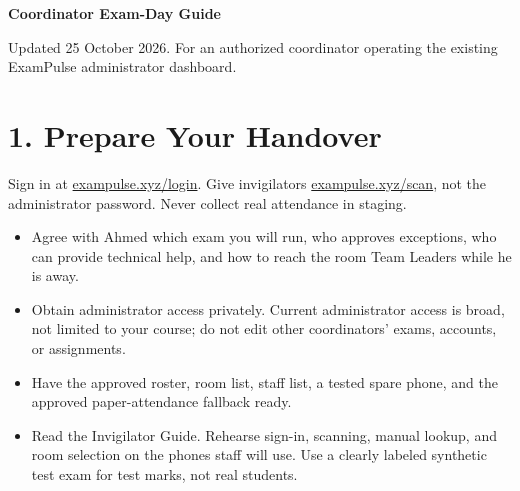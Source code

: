 \documentclass[10pt,a4paper]{article}
\begin{document}
{\LARGE\bfseries Coordinator Exam-Day Guide}\par\medskip
Updated 25 October 2026. For an authorized coordinator operating the existing ExamPulse administrator dashboard.\par
\section*{1. Prepare Your Handover}
Sign in at \href{https://exampulse.xyz/login}{exampulse.xyz/login}. Give invigilators \href{https://exampulse.xyz/scan}{exampulse.xyz/scan}, not the administrator password. Never collect real attendance in staging.\par
\begin{itemize}\item[\textbullet] Agree with Ahmed which exam you will run, who approves exceptions, who can provide technical help, and how to reach the room Team Leaders while he is away.\end{itemize}
\begin{itemize}\item[\textbullet] Obtain administrator access privately. Current administrator access is broad, not limited to your course; do not edit other coordinators' exams, accounts, or assignments.\end{itemize}
\begin{itemize}\item[\textbullet] Have the approved roster, room list, staff list, a tested spare phone, and the approved paper-attendance fallback ready.\end{itemize}
\begin{itemize}\item[\textbullet] Read the Invigilator Guide. Rehearse sign-in, scanning, manual lookup, and room selection on the phones staff will use. Use a clearly labeled synthetic test exam for test marks, not real students.\end{itemize}
\end{document}
